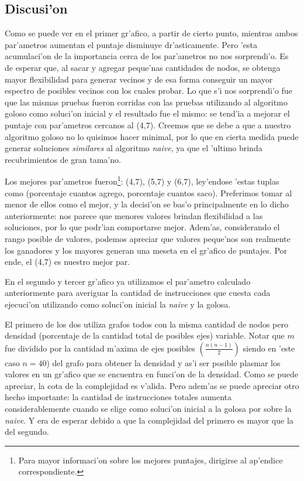 \subsection{Discusi'on}
Como se puede ver en el primer gr'afico, a partir de cierto punto, mientras ambos par'ametros aumentan el puntaje disminuye dr'asticamente. Pero 'esta acumulaci'on de la importancia cerca de los par'ametros no nos sorprendi'o. Es de esperar que, al sacar y agregar peque'nas cantidades de nodos, se obtenga mayor flexibilidad para generar vecinos y de esa forma conseguir un mayor espectro de posibles vecinos con los cuales probar. Lo que s'i nos sorprendi'o fue que las mismas pruebas fueron corridas con las pruebas utilizando al algoritmo goloso como soluci'on inicial y el resultado fue el mismo: se tend'ia a mejorar el puntaje con par'ametros cercanos al (4,7). Creemos que se debe a que a nuestro algoritmo goloso no lo quisimos hacer minimal, por lo que en cierta medida puede generar soluciones \emph{similares} al algoritmo \emph{naive}, ya que el 'ultimo brinda recubrimientos de gran tama'no.

Los mejores par'ametros fueron\footnote{Para mayor informaci'on sobre los mejores puntajes, dirigirse al ap'endice correspondiente.}: (4,7), (5,7) y (6,7), ley'endose 'estas tuplas como (porcentaje cuantos agrego, porcentaje cuantos saco). Preferimos tomar al menor de ellos como el mejor, y la decisi'on se bas'o principalmente en lo dicho anteriormente: nos parece que menores valores brindan flexibilidad a las soluciones, por lo que podr'ian comportarse mejor. Adem'as, considerando el rango posible de valores, podemos apreciar que valores peque'nos son realmente los ganadores y los mayores generan una meseta en el gr'afico de puntajes. Por ende, el (4,7) es nuestro mejor par.

En el segundo y tercer gr'afico ya utilizamos el par'ametro calculado anteriormente para averiguar la cantidad de instrucciones que cuesta cada ejecuci'on utilizando como soluci'on inicial la \emph{naive} y la golosa.

El primero de los dos utiliza grafos todos con la misma cantidad de nodos pero densidad (porcentaje de la cantidad total de posibles ejes) variable. Notar que $m$ fue dividido por la cantidad m'axima de ejes posibles $\left(\frac{n(n-1)}{2}\right)$ siendo en 'este caso $n=40$) del grafo para obtener la densidad y as'i ser posible plasmar los valores en un gr'afico que se encuentra en funci'on de la densidad. Como se puede apreciar, la cota de la complejidad es v'alida. Pero adem'as se puede apreciar otro hecho importante: la cantidad de instrucciones totales aumenta considerablemente cuando se elige como soluci'on inicial a la golosa por sobre la \emph{naive}. Y era de esperar debido a que la complejidad del primero es mayor que la del segundo.

